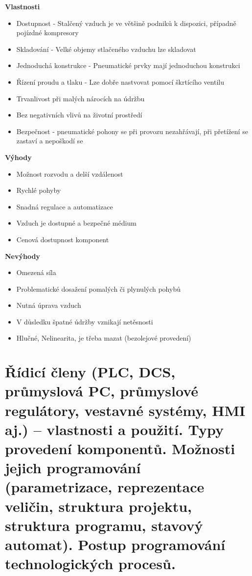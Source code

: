 \textbf{Vlastnosti}
\begin{itemize}
  \item Dostupnost - Stalčený vzduch je ve většině podniků k dispozici, případně pojízdné kompresory
  \item Skladování - Velké objemy stlačeného vzduchu lze skladovat
  \item Jednoduchá konstrukce - Pneumatické prvky mají jednoduchou konstrukci
  \item Řízení proudu a tlaku - Lze dobře nastvovat pomocí škrtícího ventilu
  \item Trvanlivost při malých nárocích na údržbu
  \item Bez negativních vlivů na životní prostředí
  \item Bezpečnost - pneumatické pohony se při provozu nezahřávají, při přetížení se zastaví a nepoškodí se
  \end{itemize}

\textbf{Výhody}
\begin{itemize}
  \item Možnost rozvodu a delší vzdálenost
  \item Rychlé pohyby
  \item Snadná regulace a automatizace
  \item Vzduch je dostupné a bezpečné médium
  \item Cenová dostupnost komponent
\end{itemize}

\textbf{Nevýhody}
\begin{itemize}
  \item Omezená síla
  \item Problematické dosažení pomalých či plynulých pohybů
  \item Nutná úprava vzduch
  \item V důsledku špatné údržby vznikají netěsnosti
  \item Hlučné, Nelinearita, je třeba mazat (bezolejové provedení)
\end{itemize}

\section{Řídicí členy (PLC, DCS, průmyslová PC, průmyslové regulátory, vestavné systémy, HMI aj.) – vlastnosti a použití. Typy provedení komponentů. Možnosti jejich programování (parametrizace, reprezentace veličin, struktura projektu, struktura programu, stavový automat). Postup programování technologických procesů.}


